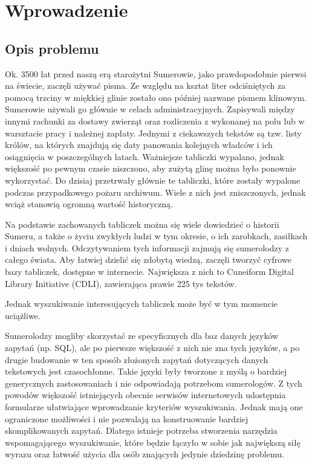 \section*{Wprowadzenie}

 

\subsection*{Opis problemu}
Ok. 3500 lat przed naszą erą starożytni Sumerowie, jako prawdopodobnie pierwsi na świecie, zaczęli używać pisma. 
Ze względu na ksztat liter odciśniętych za pomocą trzciny w miękkiej glinie zostało ono później nazwane pismem klinowym. 
Sumerowie używali go głównie w celach administracyjnych. Zapisywali między innymi rachunki za dostawy zwierząt oraz rozliczenia z 
wykonanej na polu lub w warsztacie pracy i należnej zapłaty. Jednymi z ciekawszych tekstów są tzw. listy królów, na 
których znajdują się daty panowania kolejnych władców i ich osiągnięcia w poszczególnych latach. 
Ważniejsze tabliczki wypalano, jednak większość po pewnym czasie niszczono, aby zużytą glinę można było ponownie wykorzystać. 
Do dzisiaj przetrwały głównie te tabliczki, które zostały wypalone podczas przypadkowego pożaru archiwum. 
Wiele z nich jest zniszczonych, jednak wciąż stanowią ogromną wartość historyczną. 
 
Na podstawie zachowanych tabliczek można się wiele dowiedzieć o historii Sumeru, a także o życiu zwykłych ludzi w tym okresie, 
o ich zarobkach, zasiłkach i dniach wolnych. Odczytywaniem tych informacji zajmują się sumerolodzy z całego świata. 
Aby łatwiej dzielić się zdobytą wiedzą, zaczęli tworzyć cyfrowe bazy tabliczek, dostępne w internecie. 
Największa z nich to Cuneiform Digital Library Initiative (CDLI), zawierająca prawie 225 tys tekstów.

Jednak wyszukiwanie interesujących tabliczek może być w tym momencie uciążliwe. 

Sumerolodzy mogliby skorzystać ze specyficznych dla baz danych języków zapytań (np. SQL), ale po pierwsze większość z 
nich nie zna tych języków, a po drugie budowanie w ten sposób złożonych zapytań dotyczących danych tekstowych jest czasochłonne. 
Takie języki były tworzone z myślą o bardziej generycznych zastosowaniach i nie odpowiadają potrzebom sumerologów.
Z tych powodów większość istniejących obecnie serwisów internetowych udostępnia formularze ułatwiające wprowadzanie kryteriów
 wyszukiwania. Jednak mają one ograniczone możliwości i nie pozwalają na konstruowanie bardziej skomplikowanych zapytań.
Dlatego istnieje potrzeba stworzenia narzędzia wspomagającego wyszukiwanie, które będzie łączyło w sobie jak największą siłę 
wyrazu oraz łatwość użycia dla osób znających jedynie dziedzinę problemu.

